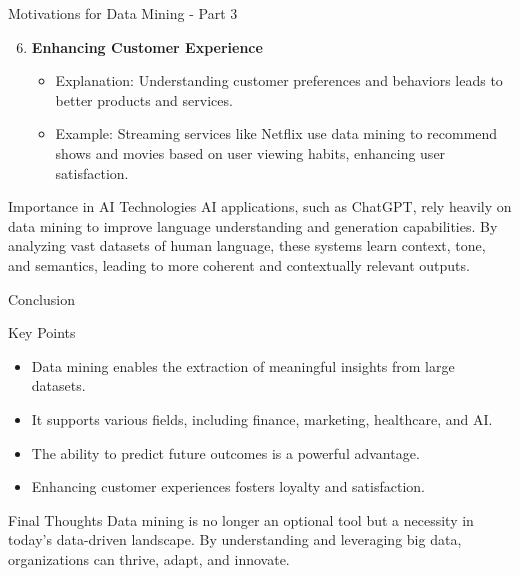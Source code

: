 \documentclass[aspectratio=169]{beamer}
\begin{document}
\begin{frame}[fragile]{Motivations for Data Mining - Part 3}
    \begin{enumerate}
        \setcounter{enumi}{5}
        \item \textbf{Enhancing Customer Experience}
        \begin{itemize}
            \item Explanation: Understanding customer preferences and behaviors leads to better products and services.
            \item Example: Streaming services like Netflix use data mining to recommend shows and movies based on user viewing habits, enhancing user satisfaction.
        \end{itemize}
    \end{enumerate}
    
    \begin{block}{Importance in AI Technologies}
        AI applications, such as ChatGPT, rely heavily on data mining to improve language understanding and generation capabilities. By analyzing vast datasets of human language, these systems learn context, tone, and semantics, leading to more coherent and contextually relevant outputs.
    \end{block}
\end{frame}

\begin{frame}[fragile]{Conclusion}
    \begin{block}{Key Points}
        \begin{itemize}
            \item Data mining enables the extraction of meaningful insights from large datasets.
            \item It supports various fields, including finance, marketing, healthcare, and AI.
            \item The ability to predict future outcomes is a powerful advantage.
            \item Enhancing customer experiences fosters loyalty and satisfaction.
        \end{itemize}
    \end{block}

    \begin{block}{Final Thoughts}
        Data mining is no longer an optional tool but a necessity in today's data-driven landscape. By understanding and leveraging big data, organizations can thrive, adapt, and innovate.
    \end{block}
\end{frame}
\end{document}
